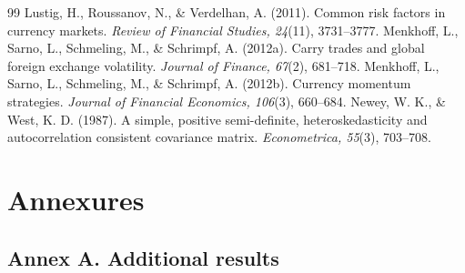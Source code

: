 \documentclass[11pt,a4paper]{article}
\begin{document}
\begin{thebibliography}{99}
 Lustig, H., Roussanov, N., \& Verdelhan, A. (2011). Common risk factors in currency markets. \emph{Review of Financial Studies, 24}(11), 3731--3777.
 Menkhoff, L., Sarno, L., Schmeling, M., \& Schrimpf, A. (2012a). Carry trades and global foreign exchange volatility. \emph{Journal of Finance, 67}(2), 681--718.
 Menkhoff, L., Sarno, L., Schmeling, M., \& Schrimpf, A. (2012b). Currency momentum strategies. \emph{Journal of Financial Economics, 106}(3), 660--684.
 Newey, W. K., \& West, K. D. (1987). A simple, positive semi-definite, heteroskedasticity and autocorrelation consistent covariance matrix. \emph{Econometrica, 55}(3), 703--708.
\end{thebibliography}

\clearpage
\appendix
\section*{Annexures}
\setcounter{table}{0}
\setcounter{figure}{0}
\subsection*{Annex A. Additional results}
\end{document}
